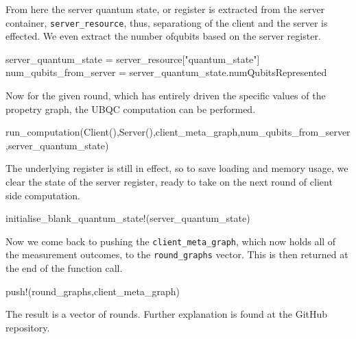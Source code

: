 \documentclass[
]{article}
\newenvironment{Shaded}{}{}
\newcommand{\FunctionTok}[1]{\textcolor[rgb]{0.02,0.16,0.49}{#1}}
\newcommand{\NormalTok}[1]{#1}
\newcommand{\OperatorTok}[1]{\textcolor[rgb]{0.40,0.40,0.40}{#1}}
\newcommand{\StringTok}[1]{\textcolor[rgb]{0.25,0.44,0.63}{#1}}
\begin{document}
From here the server quantum state, or register is extracted from the
server container, \texttt{server\_resource}, thus, separationg of the
client and the server is effected. We even extract the number ofqubits
based on the server register.

\begin{Shaded}
\begin{Highlighting}[]
\NormalTok{    server\_quantum\_state }\OperatorTok{=}\NormalTok{ server\_resource[}\StringTok{"quantum\_state"}\NormalTok{]}
\NormalTok{    num\_qubits\_from\_server }\OperatorTok{=}\NormalTok{ server\_quantum\_state.numQubitsRepresented}
\end{Highlighting}
\end{Shaded}

Now for the given round, which has entirely driven the specific values
of the propetry graph, the UBQC computation can be performed.

\begin{Shaded}
\begin{Highlighting}[]
    \FunctionTok{run\_computation}\NormalTok{(}\FunctionTok{Client}\NormalTok{(),}\FunctionTok{Server}\NormalTok{(),client\_meta\_graph,num\_qubits\_from\_server,server\_quantum\_state)}
\end{Highlighting}
\end{Shaded}

The underlying register is still in effect, so to save loading and
memory usage, we clear the state of the server register, ready to take
on the next round of client side computation.

\begin{Shaded}
\begin{Highlighting}[]
    \FunctionTok{initialise\_blank\_quantum\_state!}\NormalTok{(server\_quantum\_state)}
\end{Highlighting}
\end{Shaded}

Now we come back to pushing the \texttt{client\_meta\_graph}, which now
holds all of the measurement outcomes, to the \texttt{round\_graphs}
vector. This is then returned at the end of the function call.

\begin{Shaded}
\begin{Highlighting}[]
    \FunctionTok{push!}\NormalTok{(round\_graphs,client\_meta\_graph)}
\end{Highlighting}
\end{Shaded}

The result is a vector of rounds. Further explanation is found at the
GitHub repository.
\end{document}
